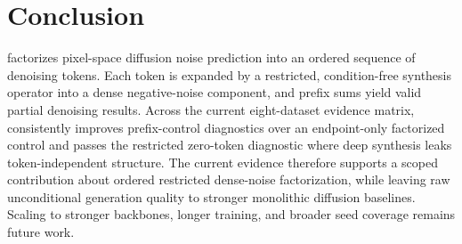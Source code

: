 \section{Conclusion}

\method{} factorizes pixel-space diffusion noise prediction into an ordered
  sequence of denoising tokens. Each token is expanded by a restricted,
condition-free synthesis operator into a dense negative-noise component, and
prefix sums yield valid partial denoising results. Across the current
eight-dataset evidence matrix, \method{} consistently improves prefix-control
diagnostics over an endpoint-only factorized control and passes the restricted zero-token
diagnostic where deep synthesis leaks token-independent structure. The current
evidence therefore supports a scoped contribution about ordered restricted
dense-noise factorization, while leaving raw unconditional generation quality
to stronger monolithic diffusion baselines. Scaling to stronger backbones,
longer training, and broader seed coverage remains future work.
